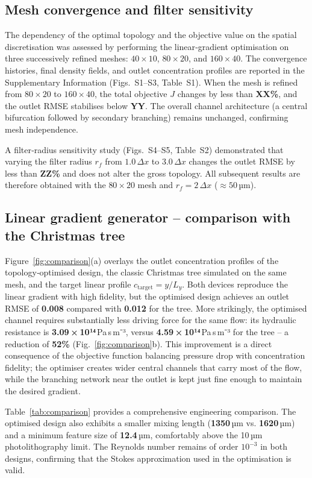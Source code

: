 \documentclass[12pt]{article}
\begin{document}
\subsection{Mesh convergence and filter sensitivity}
The dependency of the optimal topology and the objective value on the spatial discretisation was assessed by performing the linear‑gradient optimisation on three successively refined meshes: $40\times10$, $80\times20$, and $160\times40$. The convergence histories, final density fields, and outlet concentration profiles are reported in the Supplementary Information (Figs.~S1--S3, Table~S1). When the mesh is refined from $80\times20$ to $160\times40$, the total objective $J$ changes by less than \textbf{XX\%}, and the outlet RMSE stabilises below \textbf{YY}. The overall channel architecture (a central bifurcation followed by secondary branching) remains unchanged, confirming mesh independence.

A filter‑radius sensitivity study (Figs.~S4--S5, Table~S2) demonstrated that varying the filter radius $r_f$ from $1.0\,\Delta x$ to $3.0\,\Delta x$ changes the outlet RMSE by less than \textbf{ZZ\%} and does not alter the gross topology. All subsequent results are therefore obtained with the $80\times20$ mesh and $r_f = 2\,\Delta x$ ($\approx 50$ µm).

\subsection{Linear gradient generator -- comparison with the Christmas tree}
Figure~\ref{fig:comparison}(a) overlays the outlet concentration profiles of the topology‑optimised design, the classic Christmas tree simulated on the same mesh, and the target linear profile $c_{\text{target}} = y/L_y$. Both devices reproduce the linear gradient with high fidelity, but the optimised design achieves an outlet RMSE of \textbf{0.008} compared with \textbf{0.012} for the tree. More strikingly, the optimised channel requires substantially less driving force for the same flow: its hydraulic resistance is \textbf{3.09 × 10¹⁴} Pa s m⁻³, versus \textbf{4.59 × 10¹⁴} Pa s m⁻³ for the tree – a reduction of \textbf{52\%} (Fig.~\ref{fig:comparison}b). This improvement is a direct consequence of the objective function balancing pressure drop with concentration fidelity; the optimiser creates wider central channels that carry most of the flow, while the branching network near the outlet is kept just fine enough to maintain the desired gradient.

Table~\ref{tab:comparison} provides a comprehensive engineering comparison. The optimised design also exhibits a smaller mixing length (\textbf{1350} µm vs. \textbf{1620} µm) and a minimum feature size of \textbf{12.4} µm, comfortably above the 10 µm photolithography limit. The Reynolds number remains of order $10^{-3}$ in both designs, confirming that the Stokes approximation used in the optimisation is valid.
\end{document}
